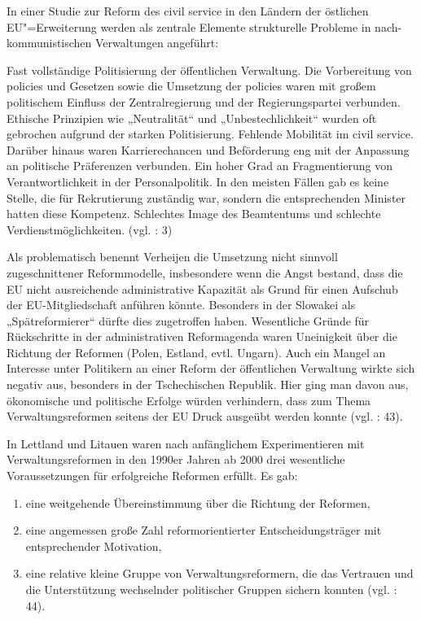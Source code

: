 In einer Studie zur Reform des civil service in den Ländern der östlichen EU"=Erweiterung werden als zentrale Elemente strukturelle Probleme in nach-kommunistischen Verwaltungen angeführt: 

Fast vollständige Politisierung der öffentlichen Verwaltung. Die Vorbereitung von policies und Gesetzen sowie die Umsetzung der policies waren mit großem politischem Einfluss der Zentralregierung und der Regierungspartei verbunden. 
Ethische Prinzipien wie „Neutralität“ und „Unbestechlichkeit“ wurden oft gebrochen aufgrund der starken Politisierung.
Fehlende Mobilität im civil service. Darüber hinaus waren Karrierechancen und Beförderung eng mit der Anpassung an politische Präferenzen verbunden.
Ein hoher Grad an Fragmentierung von Verantwortlichkeit in der Personalpolitik. 
In den meisten Fällen gab es keine Stelle, die für Rekrutierung zuständig war, sondern die entsprechenden Minister hatten diese Kompetenz.
Schlechtes Image des Beamtentums und schlechte Verdienstmöglichkeiten.
(vgl. \cite{bosdem}: 3) \par

Als problematisch benennt Verheijen die Umsetzung nicht sinnvoll zugeschnittener Reformmodelle, insbesondere wenn die Angst bestand, dass die EU nicht ausreichende administrative Kapazität als Grund für einen Aufschub der EU-Mitgliedschaft anführen könnte. Besonders in der Slowakei als „Spätreformierer“ dürfte dies zugetroffen haben. Wesentliche Gründe für Rückschritte in der administrativen Reformagenda waren Uneinigkeit über die Richtung der Reformen (Polen, Estland, evtl. Ungarn). Auch ein Mangel an Interesse unter Politikern an einer Reform der öffentlichen Verwaltung wirkte sich negativ aus, besonders in der Tschechischen Republik. Hier ging man davon aus, ökonomische und politische Erfolge würden verhindern, dass zum Thema Verwaltungsreformen seitens der EU Druck ausgeübt werden konnte (vgl. \cite{verheijen06}: 43). \par

In Lettland und Litauen waren nach anfänglichem Experimentieren mit Verwaltungsreformen in den 1990er Jahren ab 2000 drei wesentliche Voraussetzungen für erfolgreiche Reformen erfüllt. Es gab:
\begin{enumerate}
\item  eine weitgehende Übereinstimmung über die Richtung der Reformen,
\item eine angemessen große Zahl reformorientierter Entscheidungsträger mit entsprechender Motivation, 
\item eine relative kleine Gruppe von Verwaltungsreformern, die das Vertrauen und die Unterstützung wechselnder politischer Gruppen sichern konnten (vgl.  \cite{verheijen06}: 44).
\end{enumerate}

